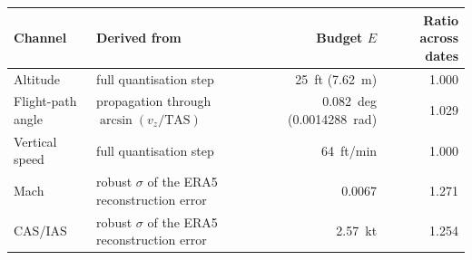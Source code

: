 \begin{tabular}{llrr}
\toprule
Channel & Derived from & Budget $E$ & Ratio across dates \\
\midrule
Altitude & full quantisation step & 25~ft (7.62~m) & 1.000 \\
Flight-path angle & propagation through $\arcsin(v_z/\mathrm{TAS})$ & 0.082~deg (0.0014288~rad) & 1.029 \\
Vertical speed & full quantisation step & 64~ft/min & 1.000 \\
Mach & robust $\sigma$ of the ERA5 reconstruction error & 0.0067 & 1.271 \\
CAS/IAS & robust $\sigma$ of the ERA5 reconstruction error & 2.57~kt & 1.254 \\
\bottomrule
\end{tabular}
